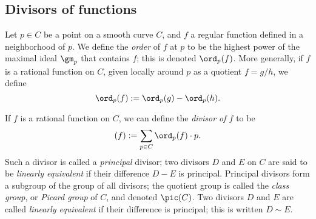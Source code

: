 %
%
%
%

\subsection{Divisors of functions}

Let $p \in C$ be a point on a smooth curve $C$, and $f$ a regular function defined in a neighborhood of $p$. We define the \emph{order} of $f$ at $p$ to be the highest power of the maximal ideal $\gm_p$ that contains $f$; this is denoted $\ord_p(f)$. More generally, if $f$ is a rational function on $C$, given locally around $p$ as a quotient $f = g/h$, we define 
$$
\ord_p(f) := \ord_p(g) - \ord_p(h).
$$

If $f$ is a rational function on $C$, we can define the \emph{divisor of $f$} to be
$$
(f) := \sum_{p \in C} \ord_p(f) \cdot p.
$$
Such a divisor is called a \emph{principal} divisor; two divisors $D$ and $E$ on $C$ are said to be \emph{linearly equivalent} if their difference $D-E$ is principal. Principal divisors form a subgroup of the group of all divisors; the quotient group is called the \emph{class group}, or \emph{Picard group} of $C$, and denoted $\pic(C)$. Two divisors $D$ and $E$ are called \emph{linearly equivalent} if their difference is principal; this is written $D \sim E$.

